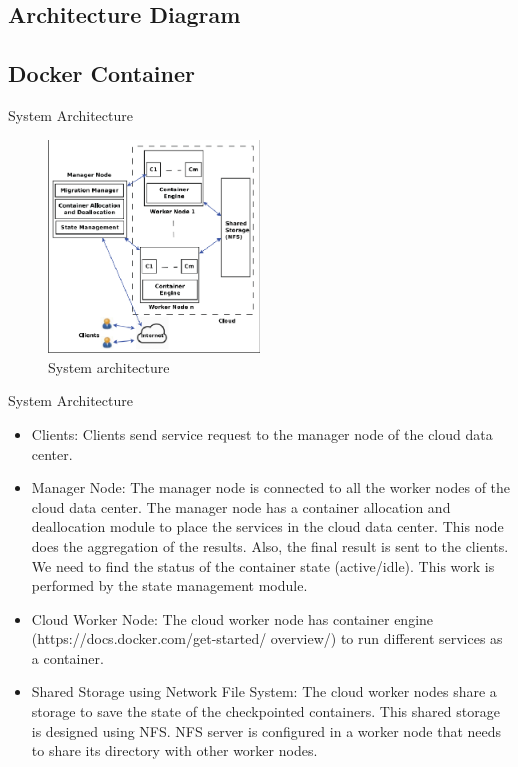 \documentclass[UKenglish]{beamer}
\begin{document}
\subsection{Architecture Diagram}
\subsection{Docker Container}

\begin{frame}{System Architecture}
    \begin{figure}[htbp]
\centerline{\includegraphics[width=0.5\textwidth]{fig1}}
\caption{System architecture}
\label{fig}
\end{figure}
\end{frame}

\begin{frame}{System Architecture}
     \begin{itemize}
\item Clients: Clients send service request to the manager
node of the cloud data center.
\item Manager Node: The manager node is connected to all
the worker nodes of the cloud data center. The manager
node has a container allocation and deallocation module
to place the services in the cloud data center. This node
does the aggregation of the results. Also, the final result
is sent to the clients. We need to find the status of the
container state (active/idle). This work is performed by
the state management module. 
\item  Cloud Worker Node: The cloud worker node has
container engine (https://docs.docker.com/get-started/
overview/) to run different services as a container.
\item Shared Storage using Network File System: The cloud
worker nodes share a storage to save the state of the
checkpointed containers. This shared storage is designed
using NFS. NFS server is configured in a worker node
that needs to share its directory with other worker nodes.

\end{itemize}
\end{frame}
\end{document}

